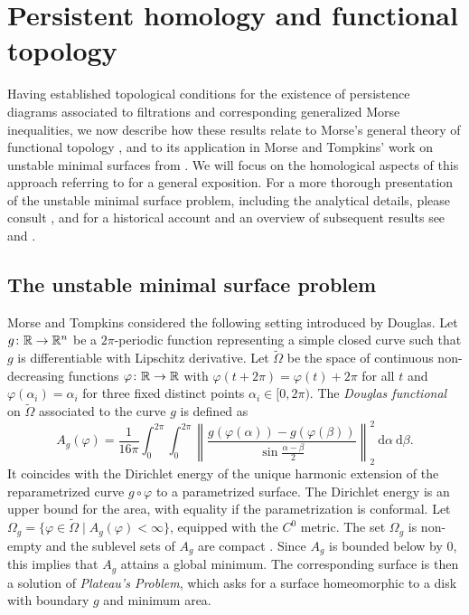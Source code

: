
\section{Persistent homology and functional topology} \label{s:surfaces}

Having established topological conditions for the existence of persistence diagrams associated to filtrations and corresponding generalized Morse inequalities, we now describe how these results relate to Morse's general theory of functional topology \cite{Morse.1937, Morse.1938, Morse.1940}, and to its application in Morse and Tompkins' work on unstable minimal surfaces from \cite{Morse.1939}.
We will focus on the homological aspects of this approach referring to \cite[Sections 4.3--5]{Bott.1980} for a general exposition.
For a more thorough presentation of the unstable minimal surface problem, including the analytical details, please consult \cite[Section II.6]{Struwe.1988}, and for a historical account and an overview of subsequent results see \cite[Section 6]{Dierkes.2010} and \cite[Section 6.8.1]{Dierkes.2010b}.

\subsection{The unstable minimal surface problem}

Morse and Tompkins considered the following setting introduced by Douglas.
Let $g \colon \mathbb{R} \to \mathbb{R}^n$ be a $2\pi$-periodic function representing a simple closed curve such that $g$ is differentiable with Lipschitz derivative.
Let $\widetilde{\Omega}$ be the space of continuous non-decreasing functions $\varphi \colon \mathbb{R} \to \mathbb{R}$ with $\varphi(t+2\pi) = \varphi(t) + 2\pi$ for all $t$ and $\varphi(\alpha_i)=\alpha_i$ for three fixed distinct points $\alpha_i \in [0,2\pi)$.
The \emph{Douglas functional} on $\widetilde \Omega$ associated to the curve $g$ is defined as
\begin{equation*}
A_g(\varphi) = \frac{1}{16 \pi} \int_0^{2\pi} \int_0^{2\pi}  \left\| \frac{g(\varphi(\alpha)) - g(\varphi(\beta))}{\sin \frac{\alpha-\beta}{2}} \right\|_2^2 \ \mathrm{d}\alpha \ \mathrm{d}\beta.
\end{equation*}
It coincides with the Dirichlet energy of the unique harmonic extension of the reparametrized curve $g \circ \varphi$ to a parametrized surface.
The Dirichlet energy is an upper bound for the area, with equality if the parametrization is conformal.
Let $\Omega_g = \{\varphi \in \widetilde\Omega \mid A_g(\varphi) < \infty\}$, equipped with the $C^0$ metric.
The set $\Omega_g$ is non-empty and the sublevel sets of $A_g$ are compact \cite[p.~448]{Morse.1939}.
Since $A_g$ is bounded below by $0$, this implies that $A_g$ attains a global minimum.
The corresponding surface is then a solution of \emph{Plateau's Problem}, which asks for a surface homeomorphic to a disk with boundary $g$ and minimum area.

